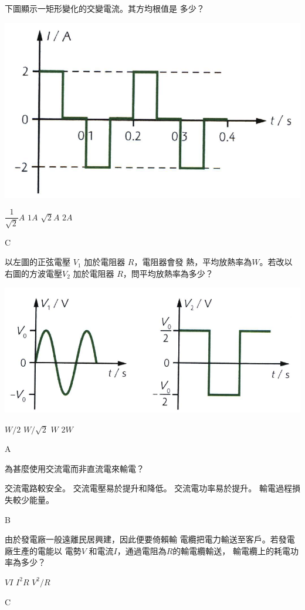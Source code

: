 {
    下圖顯示一矩形變化的交變電流。其方均根值是 多少？
    \par{\par\centering\includegraphics[width=.4\textwidth]{./img/ch_ACtransformer_mc_2024-06-17-20-23-17.png}\par}
    \begin{tasks}
        \task $\dfrac{1}{\sqrt{2}}\unit{A}$
        \task $1\unit{A}$
        \task $\sqrt{2}\unit{A}$
        \task $2\unit{A}$
    \end{tasks}
}{C}

{
    以左圖的正弦電壓 $V_1$ 加於電阻器 $R$，電阻器會發 熱，平均放熱率為$W$。若改以右圖的方波電壓$V_2$ 加於電阻器 $R$，問平均放熱率為多少？
    \par{\par\centering\includegraphics[width=.65\textwidth]{./img/ch_ACtransformer_mc_2024-06-17-20-25-50.png}\par}
    \begin{tasks}
        \task $W/2$
        \task $W/\sqrt{2}$
        \task $W$
        \task $2W$
    \end{tasks}
}{A}

{
    為甚麼使用交流電而非直流電來輸電？
    \begin{tasks}
        \task 交流電路較安全。
        \task 交流電壓易於提升和降低。
        \task 交流電功率易於提升。
        \task 輸電過程損失較少能量。
    \end{tasks}

}{
    B
}

{
    由於發電廠一般遠離民居興建，因此便要倚賴輸 電纜把電力輸送至客戶。若發電廠生產的電能以 電勢$V$ 和電流$I$，通過電阻為$R$的輸電纜輸送， 輸電纜上的耗電功率為多少？
    \begin{tasks}
        \task $VI$
        \task $I^2R$
        \task $V^2/R$
    \end{tasks}

}{C}

